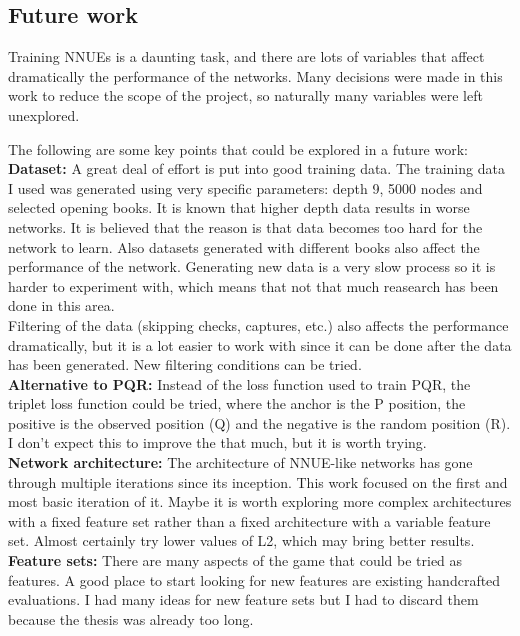\newpage
\subsection{Future work}

Training NNUEs is a daunting task, and there are lots of variables that affect dramatically the performance of the networks. Many decisions were made in this work to reduce the scope of the project, so naturally many variables were left unexplored.

The following are some key points that could be explored in a future work: \\

\textbf{Dataset:} A great deal of effort is put into good training data. The training data I used was generated using very specific parameters: depth 9, 5000 nodes and selected opening books. It is known that higher depth data results in worse networks. It is believed that the reason is that data becomes too hard for the network to learn. Also datasets generated with different books also affect the performance of the network.  Generating new data is a very slow process so it is harder to experiment with, which means that not that much reasearch has been done in this area. \\
Filtering of the data (skipping checks, captures, etc.) also affects the performance dramatically, but it is a lot easier to work with since it can be done after the data has been generated. New filtering conditions can be tried. \\

\textbf{Alternative to PQR:} Instead of the loss function used to train PQR, the triplet loss function could be tried, where the anchor is the P position, the positive is the observed position (Q) and the negative is the random position (R). I don't expect this to improve the that much, but it is worth trying. \\

\textbf{Network architecture:} The architecture of NNUE-like networks has gone through multiple iterations since its inception. This work focused on the first and most basic iteration of it. Maybe it is worth exploring more complex architectures with a fixed feature set rather than a fixed architecture with a variable feature set.
Almost certainly try lower values of L2, which may bring better results. \\

\textbf{Feature sets:} There are many aspects of the game that could be tried as features. A good place to start looking for new features are existing handcrafted evaluations. I had many ideas for new feature sets but I had to discard them because the thesis was already too long.
